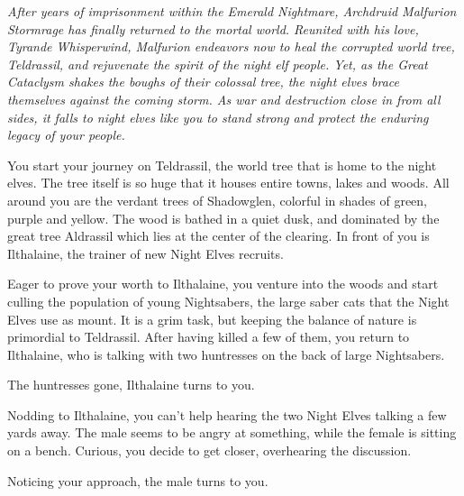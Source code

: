 \textit{After years of imprisonment within the Emerald Nightmare, Archdruid Malfurion Stormrage has finally returned to the mortal world. Reunited with his love, Tyrande Whisperwind, Malfurion endeavors now to heal the corrupted world tree, Teldrassil, and rejuvenate the spirit of the night elf people. Yet, as the Great Cataclysm shakes the boughs of their colossal tree, the night elves brace themselves against the coming storm. As war and destruction close in from all sides, it falls to night elves like you to stand strong and protect the enduring legacy of your people.}

You start your journey on Teldrassil, the world tree that is home to the night elves. The tree itself is so huge that it houses entire towns, lakes and woods. All around you are the verdant trees of Shadowglen, colorful in shades of green, purple and yellow. The wood is bathed in a quiet dusk, and dominated by the great tree Aldrassil which lies at the center of the clearing. In front of you is Ilthalaine, the trainer of new Night Elves recruits.



Eager to prove your worth to Ilthalaine, you venture into the woods and start culling the population of young Nightsabers, the large saber cats that the Night Elves use as mount. It is a grim task, but keeping the balance of nature is primordial to Teldrassil. After having killed a few of them, you return to Ilthalaine, who is talking with two huntresses on the back of large Nightsabers.


The huntresses gone, Ilthalaine turns to you.


 

Nodding to Ilthalaine, you can't help hearing the two Night Elves talking a few yards away. The male seems to be angry at something, while the female is sitting on a bench. Curious, you decide to get closer, overhearing the discussion.


Noticing your approach, the male turns to you.


